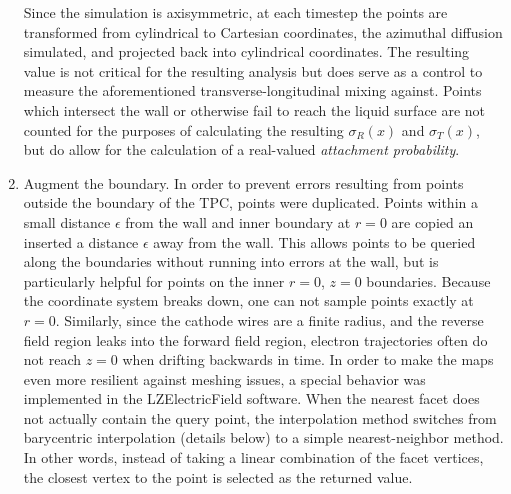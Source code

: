 \begin{enumerate}
    Since the simulation is axisymmetric, at each timestep the points are transformed from cylindrical to Cartesian coordinates, the azimuthal diffusion simulated, and projected back into cylindrical coordinates.
    The resulting value is not critical for the resulting analysis but does serve as a control to measure the aforementioned transverse-longitudinal mixing against. Points which intersect the wall or otherwise fail to reach the liquid surface are not counted for the purposes of calculating the resulting $\sigma_R(x)$ and $\sigma_T(x)$, but do allow for the calculation of a real-valued \textit{attachment probability}. 
    \item Augment the boundary.
    In order to prevent errors resulting from points outside the boundary of the TPC, points were duplicated. 
    Points within a small distance $\epsilon$ from the wall and inner boundary at $r=0$ are copied an inserted a distance $\epsilon$ away from the wall.
    This allows points to be queried along the boundaries without running into errors at the wall, but is particularly helpful for points on the inner $r=0$, $z=0$ boundaries. 
    Because the coordinate system breaks down, one can not sample points exactly at $r=0$. 
    Similarly, since the cathode wires are a finite radius, and the reverse field region leaks into the forward field region, electron trajectories often do not reach $z=0$ when drifting backwards in time.
    In order to make the maps even more resilient against meshing issues, a special behavior was implemented in the LZElectricField software.
    When the nearest facet does not actually contain the query point, the interpolation method switches from barycentric interpolation (details below) to a simple nearest-neighbor method.
    In other words, instead of taking a linear combination of the facet vertices, the closest vertex to the point is selected as the returned value.
\end{enumerate}
